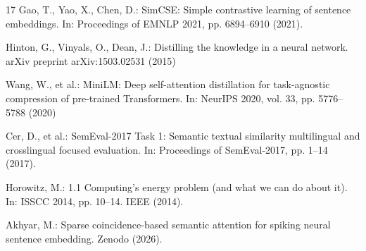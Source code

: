 \documentclass[runningheads]{llncs}
\begin{document}
\begin{thebibliography}{17}
Gao, T., Yao, X., Chen, D.: SimCSE: Simple contrastive learning of sentence embeddings. In: Proceedings of EMNLP 2021, pp. 6894--6910 (2021). 

Hinton, G., Vinyals, O., Dean, J.: Distilling the knowledge in a neural network. arXiv preprint arXiv:1503.02531 (2015)

Wang, W., et al.: MiniLM: Deep self-attention distillation for task-agnostic compression of pre-trained Transformers. In: NeurIPS 2020, vol. 33, pp. 5776--5788 (2020)

Cer, D., et al.: SemEval-2017 Task 1: Semantic textual similarity multilingual and crosslingual focused evaluation. In: Proceedings of SemEval-2017, pp. 1--14 (2017). 

Horowitz, M.: 1.1 Computing's energy problem (and what we can do about it). In: ISSCC 2014, pp. 10--14. IEEE (2014). 

Akhyar, M.: Sparse coincidence-based semantic attention for spiking neural sentence embedding. Zenodo (2026). 

\end{thebibliography}
\end{document}
